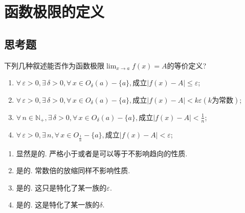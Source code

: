 \section{函数极限的定义}
 \subsection{思考题}
     \begin{exercise}
         下列几种叙述能否作为函数极限$\lim_{x\to a}f(x)=A$的等价定义?
         \begin{enumerate}
             \item $\forall\, \varepsilon>0,\exists\, \delta >0,\forall\, x\in O_\delta(a)-\{a\}, \text{成立}|f(x)-A|\leqslant \varepsilon$;
             \item $\forall\, \varepsilon>0,\exists\, \delta >0,\forall\, x\in O_\delta(a)-\{a\}, \text{成立}|f(x)-A|< k\varepsilon(k\text{为常数})$;
             \item $\forall\, n\in \mathbb{N}_+,\exists\, \delta >0,\forall\, x\in O_\delta(a)-\{a\}, \text{成立}|f(x)-A|< \frac{1}{n}$;
             \item $\forall\, \varepsilon>0,\exists\, n,\forall\, x\in O_\frac{1}{n}-\{a\}, \text{成立}|f(x)-A|< \varepsilon$;
         \end{enumerate}
     \end{exercise}
     \begin{solution}
         \begin{enumerate}
             \item 显然是的. 严格小于或者是可以等于不影响趋向的性质.
             \item 是的. 常数倍的放缩同样不影响性质.
             \item 是的. 这只是特化了某一族的$\varepsilon$.
             \item 是的. 这是特化了某一族的$\delta$.
         \end{enumerate}
     \end{solution}

